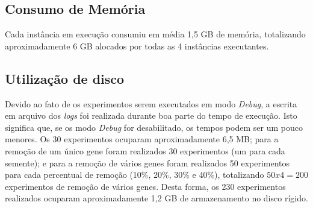 \subsection{Consumo de Memória}
Cada instância em execução consumiu em média 1,5 GB de memória, totalizando aproximadamente 6 GB alocados por todas as 4 instâncias executantes.

\subsection{Utilização de disco}
Devido ao fato de os experimentos serem executados em modo \textsl{Debug}, a escrita em arquivo dos \textsl{logs} foi realizada durante boa parte do tempo de execução.
Isto significa que, se os modo \textsl{Debug} for desabilitado, os tempos podem ser um pouco menores.
Os 30 experimentos ocuparam aproximadamente 6,5 MB; para a remoção de um único gene foram realizados 30 experimentos (um para cada semente); e para a remoção de vários genes foram realizados 50 experimentos para cada percentual de remoção (10\%, 20\%, 30\% e 40\%), totalizando $50 x 4 = 200$ experimentos de remoção de vários genes.
Desta forma, os 230 experimentos realizados ocuparam aproximadamente 1,2 GB de armazenamento no disco rígido.
